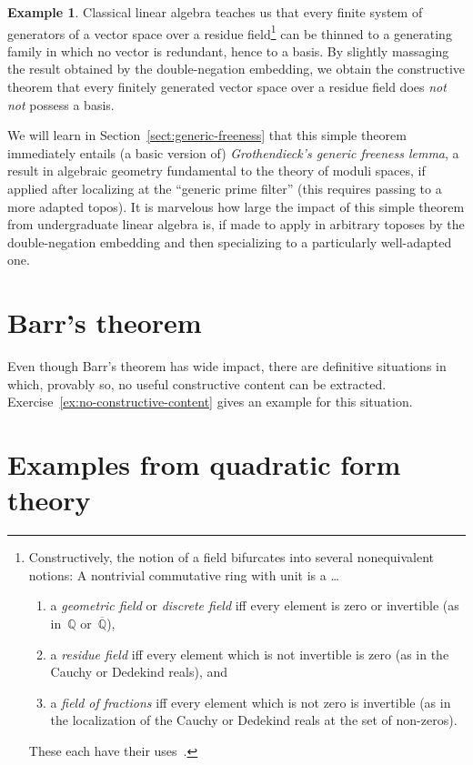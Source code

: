 \documentclass[10pt,reqno,a4paper,openany]{amsbook}
\theoremstyle{definition}
\newtheorem{ex}[defn]{Example}
\theoremstyle{plain}
\theoremstyle{remark}
\newcommand{\QQ}{\mathbb{Q}}
\newcommand{\?}{\,{:}\,}
\renewcommand{\_}{\mathpunct{.}\,}
\begin{document}
\begin{ex}Classical linear algebra teaches us that every finite system of
generators of a vector space over a residue field\footnote{Constructively, the
notion of a field bifurcates into several nonequivalent notions: A nontrivial
commutative ring with unit is a \ldots
\begin{enumerate}
\item a \emph{geometric field} or \emph{discrete field} iff
every element is zero or
invertible (as in~$\QQ$ or~$\overline{\QQ}$),
\item a \emph{residue field} iff
every element which is not invertible is zero (as in the Cauchy or Dedekind
reals), and
\item a \emph{field of fractions} iff
every element which is not zero is invertible (as in the localization of the
Cauchy or Dedekind reals at the set of non-zeros).
\end{enumerate}These each have their
uses~\cite{johnstone:rings-fields-and-spectra,mulvey:repr}.}
can be thinned to a generating family in which no vector is redundant, hence to
a basis. By slightly massaging the result obtained by the double-negation
embedding, we obtain the constructive theorem that every finitely generated
vector space over a residue field does \emph{not not} possess a basis.

We will learn in Section~\ref{sect:generic-freeness} that this simple theorem
immediately entails (a basic version of) \emph{Grothendieck's generic freeness
lemma}, a result in algebraic geometry fundamental to the theory of moduli
spaces, if applied after localizing at the ``generic prime filter'' (this
requires passing to a more adapted topos). It is marvelous how large the impact
of this simple theorem from undergraduate linear algebra is, if made to apply
in arbitrary toposes by the double-negation embedding and then specializing to
a particularly well-adapted one.\end{ex}


\section{Barr's theorem}
\newpage

Even though Barr's theorem has wide impact, there are definitive situations in
which, provably so, no useful constructive content can be extracted.
Exercise~\ref{ex:no-constructive-content} gives an example for this situation.


\section{Examples from quadratic form theory}
\newpage
\end{document}
